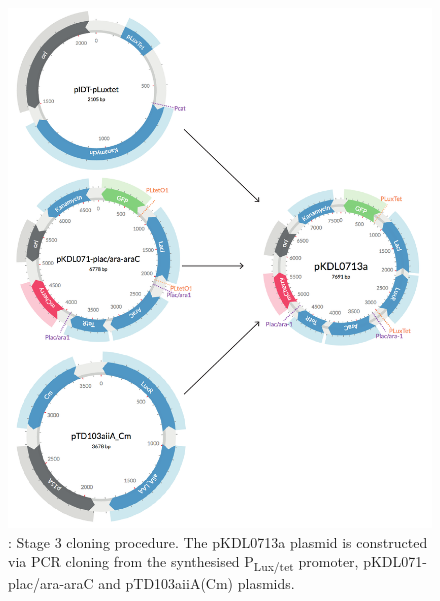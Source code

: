 \begin{figure}[htbp]
	\begin{center}
		\includegraphics[scale=0.7]{../../chapters/chapterDesignSwitches/images/stage3_cloning.pdf}
		\caption[LoF caption]{\label{fig:stage3}: Stage 3 cloning procedure. The pKDL0713a plasmid is constructed via PCR cloning from the synthesised P\textsubscript{Lux/tet} promoter, pKDL071-plac/ara-araC and pTD103aiiA(Cm) plasmids.}
	\end{center}
\end{figure}
\clearpage



